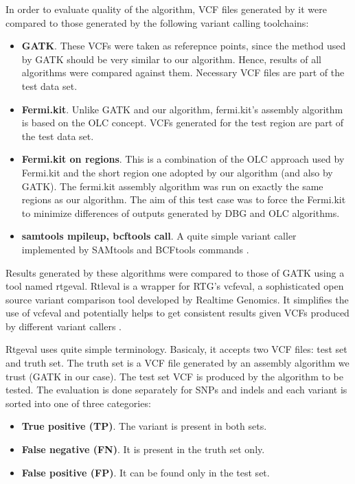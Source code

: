 In order to evaluate quality of the algorithm, VCF files generated by it were compared to those generated by the following variant calling toolchains:
\begin{itemize}
\item \textbf{GATK}. These VCFs were taken as referepnce points, since the method used by GATK should be very similar to our algorithm. Hence, results of all algorithms were compared against them. Necessary VCF files are part of the test data set.
\item \textbf{Fermi.kit}. Unlike GATK and our algorithm, fermi.kit's assembly algorithm is based on the OLC concept. VCFs generated for the test region are part of the test data set.
\item \textbf{Fermi.kit on regions}. This is a combination of the OLC approach used by Fermi.kit and the short region one adopted by our algorithm (and also by GATK). The fermi.kit assembly algorithm was run on exactly the same regions as our algorithm. The aim of this test case was to force the Fermi.kit to minimize differences of outputs generated by DBG and OLC algorithms.
\item \textbf{samtools mpileup, bcftools call}. A quite simple variant caller implemented by SAMtools and BCFtools commands \cite{samtools}.
\end{itemize}

Results generated by these algorithms were compared to those of GATK using a tool named rtgeval. Rtleval is a wrapper for RTG's vcfeval, a sophisticated open source variant comparison tool developed by Realtime Genomics. It simplifies the use of vcfeval and potentially helps to get consistent results given VCFs produced by different variant callers \cite{rtgeval}.

Rtgeval uses quite simple terminology. Basicaly, it accepts two VCF files: test set and truth set. The truth set is a VCF file generated by an assembly algorithm we trust (GATK in our case). The test set VCF is produced by the algorithm to be tested. The evaluation is done separately for SNPs and indels and each variant is sorted into one of three categories:
\begin{itemize}
\item \textbf{True positive (TP)}. The variant is present in both sets.
\item \textbf{False negative (FN)}. It is present in the truth set only.
\item \textbf{False positive (FP)}. It can be found only in the test set.
\end{itemize}


